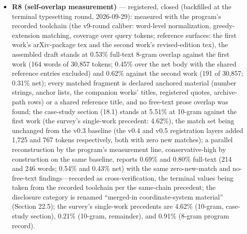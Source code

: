 \documentclass[11pt]{article}
\begin{document}
\begin{itemize}[leftmargin=1.6em,itemsep=2pt,parsep=0pt,topsep=3pt]
\item \textbf{R8 (self-overlap measurement)} — registered, closed (backfilled at the terminal typesetting round, 2026-09-29): measured with the program's recorded toolchain (the v9-round caliber: word-level normalization, greedy-extension matching, coverage over query tokens; reference surfaces: the first work's arXiv-package tex and the second work's revised-edition tex), the assembled draft stands at 0.53\% full-text 8-gram overlap against the first work (164 words of 30,857 tokens; 0.45\% over the net body with the shared reference entries excluded) and 0.62\% against the second work (191 of 30,857; 0.31\% net); every matched fragment is declared anchored material (number strings, anchor lists, the companion works' titles, registered quotes, archive-path rows) or a shared reference title, and no free-text prose overlap was found; the case-study section (18.1) stands at 5.51\% at 10-gram against the first work (the survey's single-work precedent: 4.62\%), the match set being unchanged from the v0.3 baseline (the v0.4 and v0.5 registration layers added 1,725 and 767 tokens respectively, both with zero new matches); a parallel reconstruction by the program's measurement line, conservative-high by construction on the same baseline, reports 0.69\% and 0.80\% full-text (214 and 246 words; 0.54\% and 0.43\% net) with the same zero-new-match and no-free-text findings—recorded as cross-verification, the terminal values being taken from the recorded toolchain per the same-chain precedent; the disclosure category is renamed ``merged-in coordinate-system material'' (Section 22.5); the survey's single-work precedents are 4.62\% (10-gram, case-study section), 0.21\% (10-gram, remainder), and 0.91\% (8-gram program record).
\end{itemize}
\end{document}
